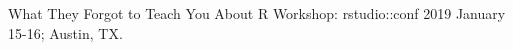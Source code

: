 \documentclass[11pt, a4paper]{article} %
\begin{document}
What They Forgot to Teach You About R Workshop: rstudio::conf 2019 January 15-16; Austin, TX.


\end{document}

